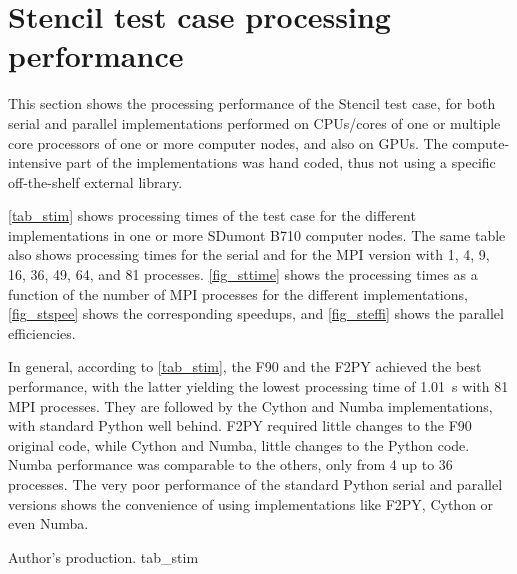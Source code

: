%
%
%
%
%
%
%
\section{Stencil test case processing performance}
\label{sec_analsten}

This section shows the processing performance of the Stencil test case, for both serial and parallel implementations performed on CPUs/cores of one or multiple core processors of one or more computer nodes, and also on GPUs. The compute-intensive part of the implementations was hand coded, thus not using a specific off-the-shelf external library. 

\autoref {tab_stim} shows processing times of the test case for the different implementations in one or more SDumont B710 computer nodes. The same table also shows processing times for the serial and for the MPI version with 1, 4, 9, 16, 36, 49, 64, and 81 processes. \autoref {fig_sttime} shows the processing times as a function of the number of MPI processes for the different implementations, \autoref {fig_stspee} shows the corresponding speedups, and \autoref {fig_steffi} shows the parallel efficiencies. 

In general, according to \autoref {tab_stim}, the F90 and the F2PY achieved the best performance, with the latter yielding the lowest processing time of 1.01~s with 81 MPI processes. They are followed by the Cython and Numba implementations, with standard Python well behind. F2PY required little changes to the F90 original code, while Cython and Numba, little changes to the Python code. Numba performance was comparable to the others, only from 4 up to 36 processes. The very poor performance of the standard Python serial and parallel versions shows the convenience of using implementations like F2PY, Cython or even Numba. 

     {Author's production.} {tab_stim}

